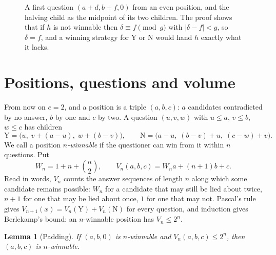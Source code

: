 \documentclass[11pt]{amsart}
\newtheorem{lemma}[thm]{Lemma}
\theoremstyle{definition}
\newcommand{\Y}{\mathrm{Y}}
\newcommand{\N}{\mathrm{N}}
\begin{document}
\begin{figure}[t]
\centering
{}
\caption{A first question $(a+d,b+f,0)$ from an even position, and the halving child as the midpoint of its two
children. The proof shows that if $h$ is not winnable then $\delta\equiv f\pmod g$ with $|\delta-f|<g$, so
$\delta=f$, and a winning strategy for $\Y$ or $\N$ would hand $h$ exactly what it lacks.}\label{fig:mid}
\end{figure}

\section{Positions, questions and volume}\label{sec:setup}

From now on $e=2$, and a position is a triple $(a,b,c)$: $a$ candidates contradicted by no answer, $b$ by one and $c$
by two. A question $(u,v,w)$ with $u\le a$, $v\le b$, $w\le c$ has children
\[
\Y=\bigl(u,\;v+(a-u),\;w+(b-v)\bigr),\qquad \N=\bigl(a-u,\;(b-v)+u,\;(c-w)+v\bigr).
\]
We call a position \emph{$n$-winnable} if the questioner can win from it within $n$ questions. Put
\[
W_n=1+n+\binom n2,\qquad V_n(a,b,c)=W_na+(n+1)b+c .
\]
Read in words, $V_n$ counts the answer sequences of length $n$ along which some candidate remains possible: $W_n$ for
a candidate that may still be lied about twice, $n+1$ for one that may be lied about once, $1$ for one that may not.
Pascal's rule gives $V_{n+1}(x)=V_n(\Y)+V_n(\N)$ for every question, and induction gives Berlekamp's bound: an
$n$-winnable position has $V_n\le2^n$.

\begin{lemma}[Padding]\label{lem:pad}
If $(a,b,0)$ is $n$-winnable and $V_n(a,b,c)\le2^n$, then $(a,b,c)$ is $n$-winnable.
\end{lemma}
\end{document}
